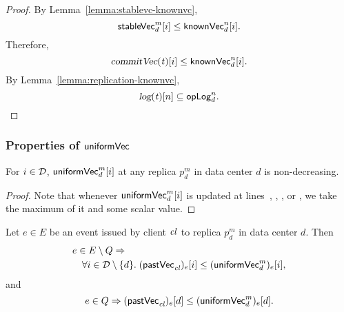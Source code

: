 \begin{proof} \label{proof:replication-stablevc}
  By Lemma~\ref{lemma:stablevc-knownvc},
  \[
    {\sf stableVec}^{m}_{d}[i] \le {\sf knownVec}^{n}_{d}[i].
  \]
  Therefore,
  \[
    \textsl{commitVec}(\mathit{t})[i] \le {\sf knownVec}^{n}_{d}[i].
  \]
  By Lemma~\ref{lemma:replication-knownvc},
  \[
    \textsl{log}(\mathit{t})[n] \subseteq {\sf opLog}^{n}_{d}.
  \]
\end{proof}
\subsubsection{Properties of ${\sf uniformVec}$}
\label{sss:uniformvc}

\begin{applemma} \label{lemma:uniformvc-nondecreasing}
  For $i \in \mathcal{D}$, ${\sf uniformVec}^{m}_{d}[i]$
  at any replica $p^{m}_{d}$ in data center $d$ is non-decreasing.
\end{applemma}

\begin{proof} \label{proof:uniformvc-nondecreasing}
  Note that whenever ${\sf uniformVec}^{m}_{d}[i]$ is updated
  at lines~\code{\ref{alg:unistore-coord}}{\ref{line:start-uniformvc}},
  \code{\ref{alg:unistore-replica}}{\ref{line:readkey-uniformvc}},
  \code{\ref{alg:unistore-replica}}{\ref{line:preparecausal-uniformvc}},
  or \code{\ref{alg:unistore-clock}}{\ref{line:stablevc-uniformvc}},
  we take the maximum of it and some scalar value.
\end{proof}

\begin{applemma} \label{lemma:pastvc-uniformvc-except-d}
  Let $e \in E$ be an event issued by client $\mathit{cl}$
  to replica $p^{m}_{d}$ in data center $d$. Then
  \begin{align*}
    &e \in E \setminus \Fence \implies \\
      &\quad \forall i \in \D \setminus \set{d}.\;
      (\pastVC_{\cl})_{e}[i] \le (\uniformVC^{m}_{d})_{e}[i],
  \end{align*}
  and
  \[
    e \in \Fence \implies (\pastVC_{\cl})_{e}[d] \le (\uniformVC^{m}_{d})_{e}[d].
  \]
\end{applemma}

